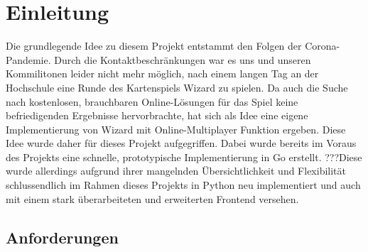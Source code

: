 \chapter{Einleitung}

Die grundlegende Idee zu diesem Projekt entstammt den Folgen der Corona-Pandemie. Durch die Kontaktbeschränkungen war es uns und unseren Kommilitonen leider nicht mehr möglich, nach einem langen Tag an der Hochschule eine Runde des Kartenspiels Wizard zu spielen. Da auch die Suche nach kostenlosen, brauchbaren Online-Lösungen für das Spiel keine befriedigenden Ergebnisse hervorbrachte, hat sich als Idee eine eigene Implementierung von Wizard mit Online-Multiplayer Funktion ergeben. Diese Idee wurde daher für dieses Projekt aufgegriffen. Dabei wurde bereits im Voraus des Projekts eine schnelle, prototypische Implementierung in Go erstellt. ???Diese wurde allerdings aufgrund ihrer mangelnden Übersichtlichkeit und Flexibilität schlussendlich im Rahmen dieses Projekts in Python neu implementiert und auch mit einem stark überarbeiteten und erweiterten Frontend versehen.

\section{Anforderungen}

